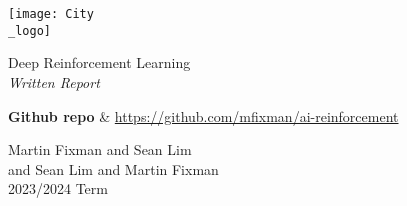 \documentclass[table,dvipsnames,11pt,a4paper]{article}
\begin{document}
\begin{titlepage}
	\centering
	\texttt{[image: City\\\_logo]} \\[4em]
	\begin{bfseries}
		\begin{Huge}
			Deep Reinforcement Learning \\[35pt]
			\textsl{Written Report}
		\end{Huge}
	\end{bfseries}
	\vfill{}
	\begin{large}
		\textbf{Github repo} & \url{https://github.com/mfixman/ai-reinforcement} \\[1em]
	\end{large}
	\begin{LARGE}
		\begin{sffamily}
			Martin Fixman and Sean Lim \\
			and Sean Lim and Martin Fixman \\
			2023/2024 Term \\
		\end{sffamily}
	\end{LARGE}
\end{titlepage}







\clearpage{}




\clearpage{}

\begin{appendices}
	
	\clearpage{}
	
	\clearpage{}
	
\end{appendices}

\clearpage{}

\end{document}
